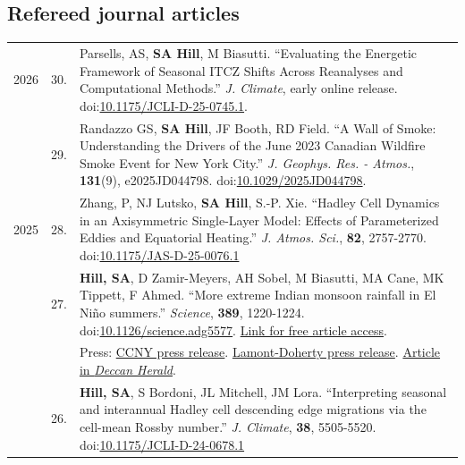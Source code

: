 \documentclass[letterpaper,11pt]{shillcv}
\begin{document}
\subsection*{Refereed journal articles}
\begin{longtable}{@{} Y{0.05\textwidth} >{\color{black}} p{0.04\textwidth} @{} L{0.91\textwidth} @{}}
2026 & 30. & Parsells, AS, \textbf{SA Hill}, M Biasutti.  ``Evaluating the Energetic Framework of Seasonal ITCZ Shifts Across Reanalyses and Computational Methods.''  \emph{J. Climate}, early online release.  doi:\href{https://doi.org/10.1175/JCLI-D-25-0745.1}{10.1175/JCLI-D-25-0745.1}.\\
     & 29. & Randazzo GS, \textbf{SA Hill}, JF Booth, RD Field.  ``A Wall of Smoke: Understanding the Drivers of the June 2023 Canadian Wildfire Smoke Event for New York City.''  \emph{J. Geophys. Res. - Atmos.}, \textbf{131}(9), e2025JD044798.  doi:\href{https://doi.org/10.1029/2025JD044798}{10.1029/2025JD044798}.\\
2025 & 28. & Zhang, P, NJ Lutsko, \textbf{SA Hill}, S.-P. Xie.  ``Hadley Cell Dynamics in an Axisymmetric Single-Layer Model: Effects of Parameterized Eddies and Equatorial Heating.''  \emph{J. Atmos. Sci.}, \textbf{82}, 2757-2770.  doi:\href{https://doi.org/10.1175/JAS-D-25-0076.1}{10.1175/JAS-D-25-0076.1}\\
     & 27. & \textbf{Hill, SA}, D Zamir-Meyers, AH Sobel, M Biasutti, MA Cane, MK Tippett, F Ahmed.  ``More extreme Indian monsoon rainfall in El Ni\~no summers.'' \emph{Science}, \textbf{389}, 1220-1224.  doi:\href{https://doi.org/10.1126/science.adg5577}{10.1126/science.adg5577}.  \href{https://www.science.org/stoken/author-tokens/ST-2917/full}{Link for free article access}.\\
& & \hspace{1.5cm} Press: \href{https://www.ccny.cuny.edu/news/unique-ccny-study-extreme-indian-rainfall-upends-conventional-wisdom}{CCNY press release}.  \href{https://lamont.columbia.edu/news/study-extreme-indian-rainfall-upends-conventional-wisdom}{Lamont-Doherty press release}.  \href{https://www.deccanherald.com/environment/el-nino-raises-chances-of-intense-daily-rain-across-central-india-says-new-study-3734879}{Article in \emph{Deccan Herald}}.\\
     & 26. & \textbf{Hill, SA}, S Bordoni, JL Mitchell, JM Lora.  ``Interpreting seasonal and interannual Hadley cell descending edge migrations via the cell-mean Rossby number.''  \emph{J. Climate}, \textbf{38}, 5505-5520.  doi:\href{https://doi.org/10.1175/JCLI-D-24-0678.1}{10.1175/JCLI-D-24-0678.1}\\

\end{longtable}
\end{document}
